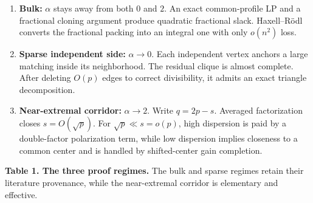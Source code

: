 \documentclass[
  american,
  11pt,
  a4paper,
]{article}
\begin{document}
\begin{enumerate}
\def\labelenumi{\arabic{enumi}.}
\item
  \textbf{Bulk:} \(\alpha\) stays away from both \(0\) and \(2\). An exact common-profile LP and a fractional cloning argument produce quadratic fractional slack. Haxell--Rödl converts the fractional packing into an integral one with only \(o(n^2)\) loss.
\item
  \textbf{Sparse independent side:} \(\alpha\to0\). Each independent vertex anchors a large matching inside its neighborhood. The residual clique is almost complete. After deleting \(O(p)\) edges to correct divisibility, it admits an exact triangle decomposition.
\item
  \textbf{Near-extremal corridor:} \(\alpha\to2\). Write \(q=2p-s\). Averaged factorization closes \(s=O(\sqrt p)\). For \(\sqrt p\ll s=o(p)\), high dispersion is paid by a double-factor polarization term, while low dispersion implies closeness to a common center and is handled by shifted-center gain completion.
\end{enumerate}

\textbf{Table 1. The three proof regimes.} The bulk and sparse regimes retain their literature provenance, while the near-extremal corridor is elementary and effective.
\end{document}
